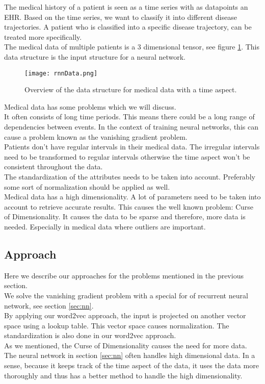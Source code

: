 The medical history of a patient is seen as a time series with as datapoints an EHR. Based on the time series, we want to classify it into different disease trajectories. A patient who is classified into a specific disease trajectory, can be treated more specifically. \\

The medical data of multiple patients is a $3$ dimensional tensor, see figure \ref{fig:rnnData}. This data structure is the input structure for a neural network.

\begin{figure}[H]
	\centering
	\texttt{[image: rnnData.png]}
	\caption{Overview of the data structure for medical data with a time aspect.}
	\label{fig:rnnData}
\end{figure} 

Medical data has some problems which we will discuss.\\
It often consists of long time periods. This means there could be a long range of dependencies between events. In the context of training neural networks, this can cause a problem known as the vanishing gradient problem. \\
Patients don't have regular intervals in their medical data. The irregular intervals need to be transformed to regular intervals otherwise the time aspect won't be consistent throughout the data. \\
The standardization of the attributes needs to be taken into account. Preferably some sort of normalization should be applied as well. \\
Medical data has a high dimensionality. A lot of parameters need to be taken into account to retrieve accurate results. This causes the well known problem: Curse of Dimensionality. It causes the data to be sparse and therefore, more data is needed. Especially in medical data where outliers are important. 


\subsection{Approach}

Here we describe our approaches for the problems mentioned in the previous section. \\
We solve the vanishing gradient problem with a special for of recurrent neural network, see section \ref{sec:nn}. \\
By applying our word2vec approach, the input is projected on another vector space using a lookup table. This vector space causes normalization. The standardization is also done in our word2vec approach. \\
As we mentioned, the Curse of Dimensionality causes the need for more data. The neural network in section \ref{sec:nn} often handles high dimensional data. In a sense, because it keeps track of the time aspect of the data, it uses the data more thoroughly and thus has a better method to handle the high dimensionality.

